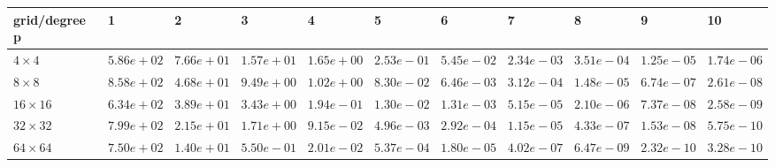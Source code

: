 \begin{tabular}{lllllllllll}
\hline
 grid/degree p   & 1          & 2          & 3          & 4          & 5          & 6          & 7          & 8          & 9          & 10         \\
\hline
 $4 \times 4$    & $5.86e+02$ & $7.66e+01$ & $1.57e+01$ & $1.65e+00$ & $2.53e-01$ & $5.45e-02$ & $2.34e-03$ & $3.51e-04$ & $1.25e-05$ & $1.74e-06$ \\
 $8 \times 8$    & $8.58e+02$ & $4.68e+01$ & $9.49e+00$ & $1.02e+00$ & $8.30e-02$ & $6.46e-03$ & $3.12e-04$ & $1.48e-05$ & $6.74e-07$ & $2.61e-08$ \\
 $16 \times 16$  & $6.34e+02$ & $3.89e+01$ & $3.43e+00$ & $1.94e-01$ & $1.30e-02$ & $1.31e-03$ & $5.15e-05$ & $2.10e-06$ & $7.37e-08$ & $2.58e-09$ \\
 $32 \times 32$  & $7.99e+02$ & $2.15e+01$ & $1.71e+00$ & $9.15e-02$ & $4.96e-03$ & $2.92e-04$ & $1.15e-05$ & $4.33e-07$ & $1.53e-08$ & $5.75e-10$ \\
 $64 \times 64$  & $7.50e+02$ & $1.40e+01$ & $5.50e-01$ & $2.01e-02$ & $5.37e-04$ & $1.80e-05$ & $4.02e-07$ & $6.47e-09$ & $2.32e-10$ & $3.28e-10$ \\
\hline
\end{tabular}